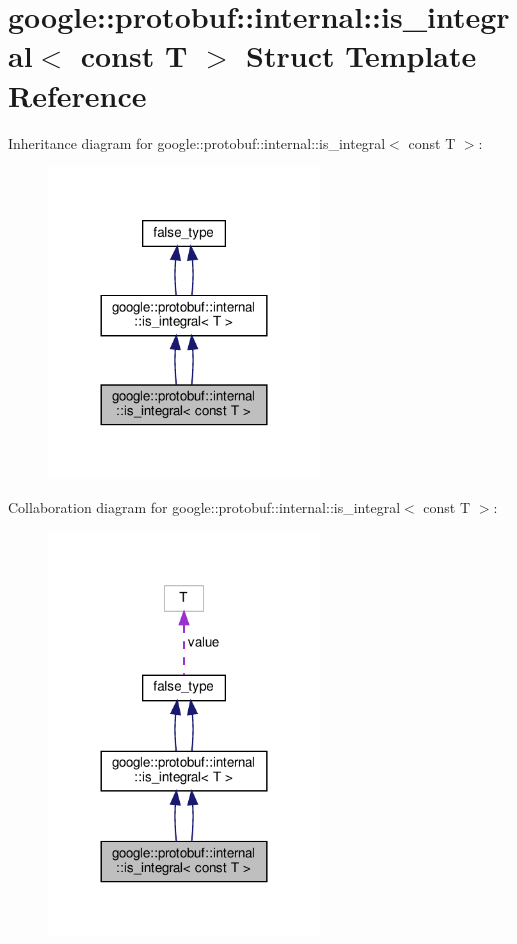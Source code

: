 \hypertarget{structgoogle_1_1protobuf_1_1internal_1_1is__integral_3_01const_01T_01_4}{}\section{google\+:\+:protobuf\+:\+:internal\+:\+:is\+\_\+integral$<$ const T $>$ Struct Template Reference}
\label{structgoogle_1_1protobuf_1_1internal_1_1is__integral_3_01const_01T_01_4}


Inheritance diagram for google\+:\+:protobuf\+:\+:internal\+:\+:is\+\_\+integral$<$ const T $>$\+:
\nopagebreak
\begin{figure}[H]
\begin{center}
\leavevmode
\includegraphics[width=204pt]{structgoogle_1_1protobuf_1_1internal_1_1is__integral_3_01const_01T_01_4__inherit__graph}
\end{center}
\end{figure}


Collaboration diagram for google\+:\+:protobuf\+:\+:internal\+:\+:is\+\_\+integral$<$ const T $>$\+:
\nopagebreak
\begin{figure}[H]
\begin{center}
\leavevmode
\includegraphics[width=204pt]{structgoogle_1_1protobuf_1_1internal_1_1is__integral_3_01const_01T_01_4__coll__graph}
\end{center}
\end{figure}
